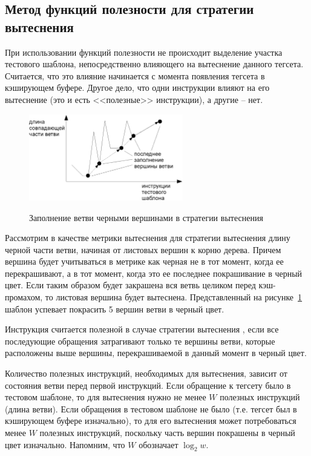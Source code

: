 \subsection{Метод функций полезности для стратегии
вытеснения \PseudoLRU}

При использовании функций полезности не происходит выделение участка
тестового шаблона, непосредственно влияющего на вытеснение данного
тегсета. Считается, что это влияние начинается с момента появления
тегсета в кэширующем буфере. Другое дело, что одни инструкции влияют
на его вытеснение (это и есть <<полезные>> инструкции), а другие --
нет.

\begin{figure}[h] \center
  \includegraphics[width=0.6\textwidth]{2.theor/plru-useful}\\
  \caption{Заполнение ветви черными вершинами в стратегии вытеснения
  \PseudoLRU}\label{plru-useful}
\end{figure}

Рассмотрим в качестве метрики вытеснения для стратегии вытеснения
\PseudoLRU длину черной части ветви, начиная от листовых вершин к
корню дерева. Причем вершина будет учитываться в метрике как черная
не в тот момент, когда ее перекрашивают, а в тот момент, когда это
ее последнее покрашивание в черный цвет. Если таким образом будет
закрашена вся ветвь целиком перед кэш-промахом, то листовая вершина
будет вытеснена. Представленный на рисунке~\ref{plru-useful} шаблон
успевает
покрасить 5 вершин ветви в черный цвет. %

\begin{utv}
Инструкция считается полезной в случае стратегии вытеснения
\PseudoLRU, если все последующие обращения затрагивают только те
вершины ветви, которые расположены выше вершины, перекрашиваемой в
данный момент в черный цвет.
\end{utv}

Количество полезных инструкций, необходимых для вытеснения, зависит
от состояния ветви перед первой инструкций. Если обращение к тегсету
было в тестовом шаблоне, то для вытеснения нужно не менее $W$
полезных инструкций (длина ветви). Если обращения в тестовом шаблоне
не было (т.е. тегсет был в кэширующем буфере изначально), то для его
вытеснения может потребоваться менее $W$ полезных инструкций,
поскольку часть вершин покрашены в черный цвет изначально. Напомним,
что $W$ обозначает $\log_2 w$.


